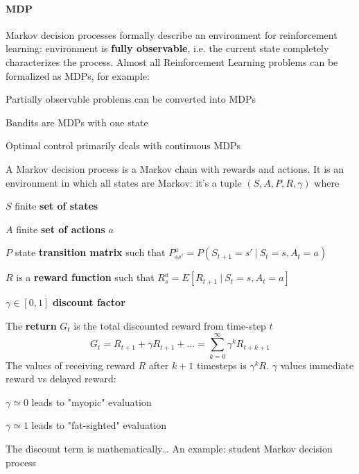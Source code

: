\documentclass[10pt]{report}
\begin{document}
\paragraph{MDP} Markov decision processes formally describe an environment for reinforcement learning: environment is \textbf{fully observable}, i.e. the current state completely characterizes the process. Almost all Reinforcement Learning problems can be formalized as MDPs, for example:
\begin{list}{}{}
	\item Partially observable problems can be converted into MDPs
	\item Bandits are MDPs with one state
	\item Optimal control primarily deals with continuous MDPs
\end{list}
A Markov decision process is a Markov chain with rewards and actions. It is an environment in which all states are Markov: it's a tuple $(S, A, P, R, \gamma)$ where\begin{list}{}{}
	\item $S$ finite \textbf{set of states}
	\item $A$ finite \textbf{set of actions} $a$
	\item $P$ state \textbf{transition matrix} such that $P_{ss'}^a = P(S_{t+1}=s'\:|\:S_t=s, A_t=a)$
	\item $R$ is a \textbf{reward function} such that $R_s^a = E[R_{t+1}\:|\:S_t=s,A_t=a]$
	\item $\gamma\in [0,1]$ \textbf{discount factor}
\end{list}
The \textbf{return} $G_t$ is the total discounted reward from time-step $t$
$$G_t = R_{t+1} + \gamma R_{t+1}+\ldots = \sum_{k=0}^\infty \gamma^kR_{t+k+1}$$
The values of receiving reward $R$ after $k+1$ timesteps is $\gamma^k R$. $\gamma$ values immediate reward vs delayed reward:
\begin{list}{}{}
	\item $\gamma\simeq 0$ leads to "myopic" evaluation
	\item $\gamma\simeq 1$ leads to "fat-sighted" evaluation
\end{list}
The discount term is mathematically\ldots %
An example: student Markov decision process
\end{document}
